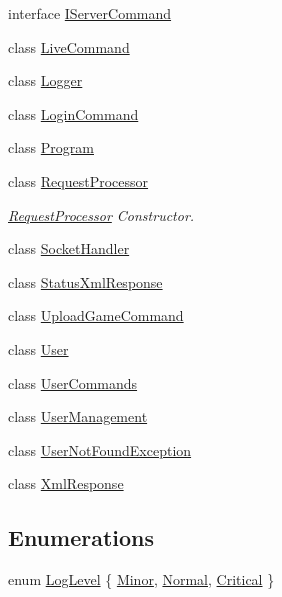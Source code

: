 \begin{DoxyCompactItemize}
\item 
interface \hyperlink{interface_damp_server_1_1_i_server_command}{I\-Server\-Command}
\item 
class \hyperlink{class_damp_server_1_1_live_command}{Live\-Command}
\item 
class \hyperlink{class_damp_server_1_1_logger}{Logger}
\item 
class \hyperlink{class_damp_server_1_1_login_command}{Login\-Command}
\item 
class \hyperlink{class_damp_server_1_1_program}{Program}
\item 
class \hyperlink{class_damp_server_1_1_request_processor}{Request\-Processor}
\begin{DoxyCompactList}\small\item\em \hyperlink{class_damp_server_1_1_request_processor}{Request\-Processor} Constructor. \end{DoxyCompactList}\item 
class \hyperlink{class_damp_server_1_1_socket_handler}{Socket\-Handler}
\item 
class \hyperlink{class_damp_server_1_1_status_xml_response}{Status\-Xml\-Response}
\item 
class \hyperlink{class_damp_server_1_1_upload_game_command}{Upload\-Game\-Command}
\item 
class \hyperlink{class_damp_server_1_1_user}{User}
\item 
class \hyperlink{class_damp_server_1_1_user_commands}{User\-Commands}
\item 
class \hyperlink{class_damp_server_1_1_user_management}{User\-Management}
\item 
class \hyperlink{class_damp_server_1_1_user_not_found_exception}{User\-Not\-Found\-Exception}
\item 
class \hyperlink{class_damp_server_1_1_xml_response}{Xml\-Response}
\end{DoxyCompactItemize}
\subsection*{Enumerations}
\begin{DoxyCompactItemize}
\item 
enum \hyperlink{namespace_damp_server_aa917b4f462dd83f2284f818f2dc7729f}{Log\-Level} \{ \hyperlink{namespace_damp_server_aa917b4f462dd83f2284f818f2dc7729fa6fed0c378a4b4e8c1e7dc5c16dabb388}{Minor}, 
\hyperlink{namespace_damp_server_aa917b4f462dd83f2284f818f2dc7729fa960b44c579bc2f6818d2daaf9e4c16f0}{Normal}, 
\hyperlink{namespace_damp_server_aa917b4f462dd83f2284f818f2dc7729fa278d01e5af56273bae1bb99a98b370cd}{Critical}
 \}
\end{DoxyCompactItemize}


